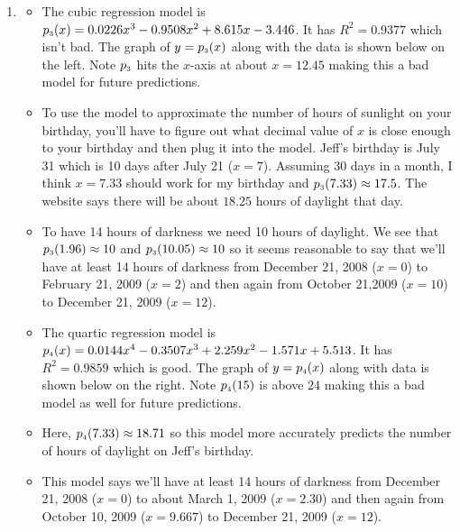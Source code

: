 \begin{enumerate}
\setcounter{enumi}{\value{HW}}


\item \begin{itemize} \item The cubic regression model is $p_{\mbox{\tiny $3$}}(x) = 0.0226x^{3} - 0.9508x^{2} + 8.615x - 3.446$.  It has $R^{2} = 0.9377$ which isn't bad.  The graph of $y = p_{\mbox{\tiny $3$}}(x)$ along with the data is shown below on the left.  Note $p_{\mbox{\tiny $3$}}$ hits the $x$-axis at about $x = 12.45$ making this a bad model for future predictions.  

\item To use the model to approximate the number of hours of sunlight on your birthday, you'll have to figure out what decimal value of $x$ is close enough to your birthday and then plug it into the model.  Jeff's birthday is July 31 which is 10 days after July 21 ($x = 7$).  Assuming 30 days in a month, I think $x = 7.33$ should work for my birthday and $p_{\mbox{\tiny $3$}}(7.33) \approx 17.5$.  The website says there will be about $18.25$ hours of daylight that day. 

\item  To have 14 hours of darkness we need 10 hours of daylight.  We see that $p_{\mbox{\tiny $3$}}(1.96) \approx 10$ and $p_{\mbox{\tiny $3$}}(10.05) \approx 10$ so it seems reasonable to say that we'll have at least 14 hours of darkness from December 21, 2008 ($x = 0$) to February 21, 2009 ($x = 2$) and then again from October 21,2009 ($x = 10$) to December 21, 2009 ($x = 12$).

\end{itemize}

\begin{itemize}

\item The quartic regression model is $p_{\mbox{\tiny $4$}}(x) = 0.0144x^{4} - 0.3507x^{3} + 2.259x^{2} - 1.571x + 5.513$.  It has $R^{2} = 0.9859$ which is good.  The graph of $y = p_{\mbox{\tiny $4$}}(x)$  along with data is shown below on the right.  Note  $p_{\mbox{\tiny $4$}}(15)$ is above $24$ making this a bad model as well for future predictions.  

\item Here, $p_{\mbox{\tiny $4$}}(7.33) \approx 18.71$ so this model more accurately predicts the number of hours of daylight on Jeff's birthday.  

\item This model says we'll have at least 14 hours of darkness from December 21, 2008 ($x = 0$) to about March 1, 2009 ($x = 2.30$) and then again from October 10, 2009 ($x = 9.667$) to December 21, 2009 ($x = 12$).


\end{itemize}
\end{enumerate}
